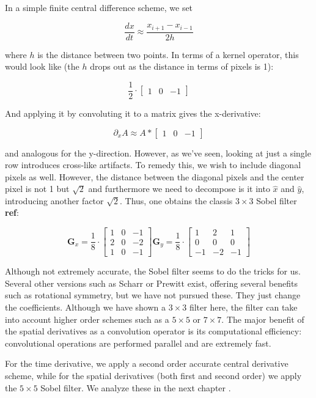 \documentclass[12pt,a4paper,]{harvard-thesis}
\begin{document}
In a simple finite central difference scheme, we set

\[
\frac{dx}{dt}\approx\frac{x_{i+1}-x_{i-1}}{2h}
\]

where \(h\) is the distance between two points. In terms of a kernel
operator, this would look like (the \(h\) drops out as the distance in
terms of pixels is 1):

\[\frac{1}{2}\cdot
\begin{bmatrix}
1 & 0 & -1
\end{bmatrix}
\]

And applying it by convoluting it to a matrix gives the x-derivative:

\[
\partial_xA\approx A*\begin{bmatrix}
1 & 0 & -1
\end{bmatrix}
\]

and analogous for the y-direction. However, as we've seen, looking at
just a single row introduces cross-like artifacts. To remedy this, we
wish to include diagonal pixels as well. However, the distance between
the diagonal pixels and the center pixel is not 1 but \(\sqrt{2}\) and
furthermore we need to decompose is it into \(\hat{x}\) and \(\hat{y}\),
introducing another factor \(\sqrt{2}\). Thus, one obtains the classis
\(3\times3\) Sobel filter \textbf{ref}:

\[
\mathbf G_x=\frac{1}{8}\cdot
\begin{bmatrix}
1 & 0 & -1\\
2 & 0 & -2\\
1 & 0 & -1
\end{bmatrix}
\mathbf G_y=\frac{1}{8}\cdot
\begin{bmatrix}
1 & 2 & 1 \\
0 & 0 & 0 \\
-1 & -2 & -1
\end{bmatrix}
\]

Although not extremely accurate, the Sobel filter seems to do the tricks
for us. Several other versions such as Scharr or Prewitt exist, offering
several benefits such as rotational symmetry, but we have not pursued
these. They just change the coefficients. Although we have shown a
\(3\times3\) filter here, the filter can take into account higher order
schemes such as a \(5\times5\) or \(7\times7\). The major benefit of the
spatial derivatives as a convolution operator is its computational
efficiency: convolutional operations are performed parallel and are
extremely fast.

For the time derivative, we apply a second order accurate central
derivative scheme, while for the spatial derivatives (both first and
second order) we apply the \(5\times5\) Sobel filter. We analyze these
in the next chapter .
\end{document}
